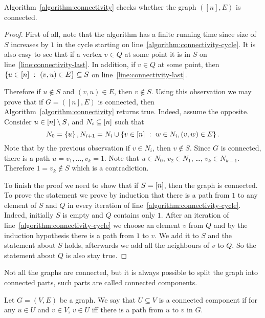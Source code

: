 \begin{theorem}
  Algorithm~\ref{algorithm:connectivity} checks whether the graph $([n], E)$
  is connected.
\end{theorem}
\begin{proof}
  First of all, note that the algorithm has a finite running time since
  size of $S$ increases by $1$ in the cycle starting on
  line~\ref{algorithm:connectivity-cycle}.
  It is also easy to see that if a vertex $v \in Q$ at some point it is
  in $S$ on line~\ref{line:connectivity-last}. In addition, if $v \in Q$
  at some point, then $\set[{(v, u) \in E}]{u \in \range{n}} \subseteq S$ on
  line~\ref{line:connectivity-last}.

  Therefore if $u \notin S$ and $(v, u) \in E$,
  then $v \notin S$. Using this observation we may prove that
  if $G = ([n], E)$ is connected, then Algorithm~\ref{algorithm:connectivity}
  returns true. Indeed, assume the opposite. Consider $u \in [{n}] \setminus S$,
  and $N_i \subseteq [{n}]$ such that \[
    N_0 = \set{u},
    N_{i + 1} = N_i \cup \set[{w \in N_i, (v, w) \in E}]{v \in \range{n}}.
  \]
  Note that by the previous observation if $v \in N_i$, then $v \notin S$.
  Since $G$ is connected, there is a path $u = v_1, \dots, v_k = 1$.
  Note that $u \in N_0$, $v_2 \in N_1$, \dots, $v_k \in N_{k - 1}$.
  Therefore $1 = v_k \notin S$ which is a contradiction.

  To finish the proof we need to show that if $S = [{n}]$, then the graph is
  connected. To prove the statement we prove by induction that there is a path
  from $1$ to any element of $S$ and $Q$ in every iteration of
  line~\ref{algorithm:connectivity-cycle}. Indeed, initially $S$ is empty and
  $Q$ contains only $1$. After an iteration of
  line~\ref{algorithm:connectivity-cycle} we choose an element $v$ from $Q$
  and by the induction hypothesis there is a path from $1$ to $v$.
  We add it to $S$ and the statement about $S$ holds, afterwards we
  add all the neighbours of $v$ to $Q$. So the statement about $Q$ is
  also stay true.
\end{proof}

Not all the graphs are connected, but it is always possible to split the
graph into connected parts, such parts are called connected components.
\begin{definition}
  Let $G = (V, E)$ be a graph. We say that $U \subseteq V$ is a connected
  component if for any $u \in U$ and $v \in V$,
  $v \in U$ iff there is a path from $u$ to $v$ in $G$.
\end{definition}


